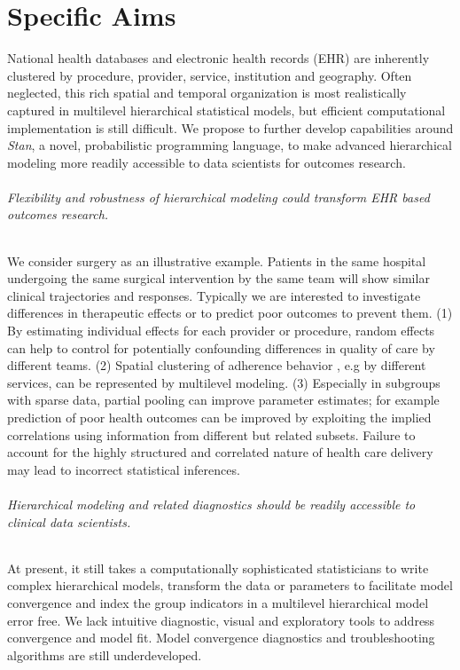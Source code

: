 \documentclass[11pt,notitlepage]{article}
\begin{document}
\part*{Specific Aims}
National health databases and electronic health records (EHR) are inherently 
clustered by procedure, provider, service, institution and geography. Often 
neglected, this rich spatial and temporal organization is most realistically 
captured in multilevel hierarchical statistical models, but efficient 
computational implementation is still difficult. We propose to further 
develop capabilities around \textit{Stan}, a novel, probabilistic programming language, 
to make advanced hierarchical modeling more readily accessible to data scientists 
for outcomes research. 

\paragraph*{Flexibility and robustness of hierarchical modeling could 
transform EHR based outcomes research.} We consider surgery as an 
illustrative example. Patients in the same hospital undergoing the 
same surgical intervention by the same team will show similar clinical 
trajectories and responses. Typically we are interested to investigate 
differences in therapeutic effects or to predict poor outcomes to prevent 
them. (1) By estimating individual effects for each provider or procedure, 
random effects can help to control for potentially confounding differences 
in quality of care by different teams. (2) Spatial clustering of adherence 
behavior , e.g by different services, can be represented by multilevel modeling. 
(3) Especially in subgroups with sparse data, partial pooling can improve 
parameter estimates; for example prediction of poor health outcomes can be 
improved by exploiting the implied correlations using information from 
different but related subsets. Failure to account for the highly 
structured and correlated nature of health care delivery may lead 
to incorrect statistical inferences.

\paragraph*{Hierarchical modeling and related diagnostics should be readily accessible 
to clinical data scientists.} At present, it still takes a computationally 
sophisticated statisticians to write complex hierarchical models, transform 
the data or parameters to facilitate model convergence and index the group 
indicators in a multilevel hierarchical model error free. We lack intuitive 
diagnostic, visual and exploratory tools to address convergence and model fit. 
Model convergence diagnostics and troubleshooting algorithms are still underdeveloped. 
\end{document}
